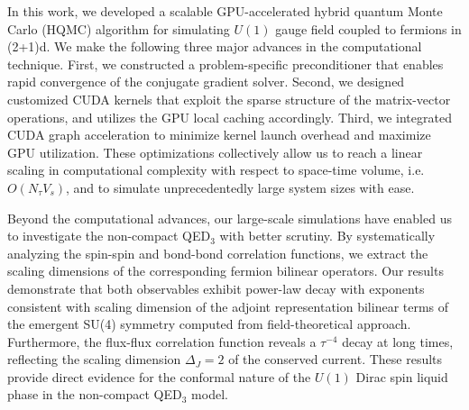\documentclass[aps,prl,twocolumn,superscriptaddress,showpacs,longbibliography]{revtex4-2}
\begin{document}
In this work, we developed a scalable GPU-accelerated hybrid quantum Monte Carlo (HQMC) algorithm for simulating $U(1)$ gauge field coupled to fermions in (2+1)d. We make the following three major advances in the computational technique.
First, we constructed a problem-specific preconditioner that enables rapid convergence of the conjugate gradient solver. Second, we designed customized CUDA kernels that exploit the sparse structure of the matrix-vector operations, and utilizes the GPU local caching accordingly. Third, we integrated CUDA graph acceleration to minimize kernel launch overhead and maximize GPU utilization.
These optimizations collectively allow us to reach a linear scaling in computational complexity with respect to space-time volume, i.e.\ $O(N_\tau V_s)$, and to simulate unprecedentedly large system sizes with ease.

Beyond the computational advances, our large-scale simulations have enabled us to investigate the non-compact QED$_3$ with better scrutiny. By systematically analyzing the spin-spin and bond-bond correlation functions, we extract the scaling dimensions of the corresponding fermion bilinear operators. Our results demonstrate that both observables exhibit power-law decay with exponents consistent with
scaling dimension of the adjoint representation bilinear terms of the emergent SU(4) symmetry computed from field-theoretical approach. Furthermore, the flux-flux correlation function reveals a $\tau^{-4}$ decay at long times, reflecting the scaling dimension $\Delta_J=2$ of the conserved current. These results provide direct evidence for the conformal nature of the $U(1)$ Dirac spin liquid phase in the non-compact QED$_3$ model.
\end{document}

